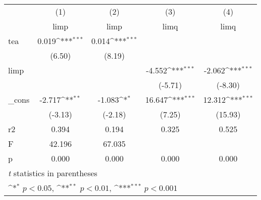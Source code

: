 {
\def\sym#1{\ifmmode^{#1}\else\(^{#1}\)\fi}
\begin{tabular}{l*{4}{c}}
\hline\hline
            &\multicolumn{1}{c}{(1)}&\multicolumn{1}{c}{(2)}&\multicolumn{1}{c}{(3)}&\multicolumn{1}{c}{(4)}\\
            &\multicolumn{1}{c}{limp}&\multicolumn{1}{c}{limp}&\multicolumn{1}{c}{limq}&\multicolumn{1}{c}{limq}\\
\hline
tea         &       0.019\sym{***}&       0.014\sym{***}&                     &                     \\
            &      (6.50)         &      (8.19)         &                     &                     \\
[1em]
limp        &                     &                     &      -4.552\sym{***}&      -2.062\sym{***}\\
            &                     &                     &     (-5.71)         &     (-8.30)         \\
[1em]
\_cons      &      -2.717\sym{**} &      -1.083\sym{*}  &      16.647\sym{***}&      12.312\sym{***}\\
            &     (-3.13)         &     (-2.18)         &      (7.25)         &     (15.93)         \\
\hline
r2          &       0.394         &       0.194         &       0.325         &       0.525         \\
F           &      42.196         &      67.035         &                     &                     \\
p           &       0.000         &       0.000         &       0.000         &       0.000         \\
\hline\hline
\multicolumn{5}{l}{\footnotesize \textit{t} statistics in parentheses}\\
\multicolumn{5}{l}{\footnotesize \sym{*} \(p<0.05\), \sym{**} \(p<0.01\), \sym{***} \(p<0.001\)}\\
\end{tabular}
}
